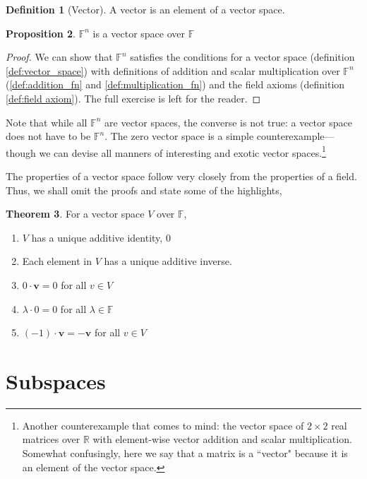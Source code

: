 \documentclass[12pt]{report}
\numberwithin{equation}{section}
\renewcommand{\b}[1]{\boldsymbol{#1}}
\theoremstyle{definition}
\newtheorem{theorem}{Theorem}[section]
\newtheorem{definition}[theorem]{Definition}
\newtheorem{proposition}[theorem]{Proposition}
\begin{document}
\begin{definition}[Vector]
	A vector is an element of a vector space.
\end{definition}

\begin{proposition} 
	$ \mathbb{F}^n $ is a vector space over $ \mathbb{F} $
\end{proposition}
\begin{proof}
	We can show that $ \mathbb{F}^n $ satisfies the conditions for a vector space (definition \ref{def:vector_space}) with definitions of addition and scalar multiplication over $ \mathbb{F}^n $ (\ref{def:addition_fn} and \ref{def:multiplication_fn}) and the field axioms (definition \ref{def:field axiom}). The full exercise is left for the reader.
\end{proof}

Note that while all $ \mathbb{F}^n $ are vector spaces, the converse is not true: a vector space does not have to be $ \mathbb{F}^n $. The zero vector space is a simple counterexample---though we can devise all manners of interesting and exotic vector spaces.\footnote{Another counterexample that comes to mind: the vector space of $ 2\times2 $ real matrices over $ \mathbb{R} $ with element-wise vector addition and scalar multiplication. Somewhat confusingly, here we say that a matrix is a ``vector" because it is an element of the vector space.}

The properties of a vector space follow very closely from the properties of a field. Thus, we shall omit the proofs and state some of the highlights,
\begin{theorem}
	For a vector space $ V $ over $ \mathbb{F} $,
	\begin{enumerate}
		\item $ V $ has a unique additive identity, $ 0 $
		\item Each element in $ V $ has a unique additive inverse.
		\item $ 0\cdot \b{v} = 0 $ for all $ v\in V $
		\item $ \lambda\cdot0 = 0 $ for all $ \lambda\in \mathbb{F} $
		\item $ (-1) \cdot \b{v} = -\b{v}$ for all $ v\in V $
	\end{enumerate}
\end{theorem}

\section{Subspaces}
\end{document}
